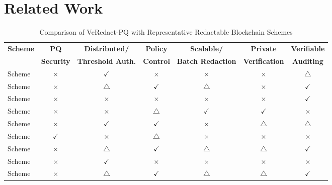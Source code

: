 \documentclass[lettersize,journal]{IEEEtran}
\begin{document}
    \section{Related Work}
    \begin{table}[t]
    \centering
    \caption{Comparison of VeRedact-PQ with Representative Redactable
    Blockchain Schemes}
    \label{tab:comparison}
    \renewcommand{\arraystretch}{1.15}
    \setlength{\tabcolsep}{4.2pt}
    \begin{tabular}{lcccccc}
    \hline
    \textbf{Scheme} &
    \textbf{PQ} &
    \textbf{Distributed/} &
    \textbf{Policy} &
    \textbf{Scalable/} &
    \textbf{Private} &
    \textbf{Verifiable} \\
    &
    \textbf{Security} &
    \textbf{Threshold Auth.} &
    \textbf{Control} &
    \textbf{Batch Redaction} &
    \textbf{Verification} &
    \textbf{Auditing} \\
    \hline
    
    Scheme~\cite{ref1}
    & $\times$ & $\checkmark$ & $\times$ & $\times$
    & $\times$ & $\triangle$ \\
    
    Scheme~\cite{ref5}
    & $\times$ & $\triangle$ & $\checkmark$ & $\triangle$
    & $\times$ & $\checkmark$ \\
    
    Scheme~\cite{ref13}
    & $\times$ & $\times$ & $\times$ & $\times$
    & $\times$ & $\checkmark$ \\
    
    Scheme~\cite{ref14}
    & $\times$ & $\times$ & $\triangle$ & $\checkmark$
    & $\checkmark$ & $\times$ \\
    
    Scheme~\cite{ref15}
    & $\times$ & $\checkmark$ & $\checkmark$ & $\times$
    & $\triangle$ & $\triangle$ \\
    
    Scheme~\cite{ref17}
    & $\checkmark$ & $\times$ & $\triangle$ & $\times$
    & $\times$ & $\times$ \\
    
    Scheme~\cite{ref20}
    & $\times$ & $\triangle$ & $\checkmark$ & $\triangle$
    & $\triangle$ & $\checkmark$ \\
    
    Scheme~\cite{ref27}
    & $\times$ & $\checkmark$ & $\times$ & $\times$
    & $\times$ & $\times$ \\
    
    Scheme~\cite{ref33}
    & $\times$ & $\triangle$ & $\checkmark$ & $\triangle$
    & $\triangle$ & $\checkmark$ \\
    

\end{tabular}
\end{table}
\end{document}

